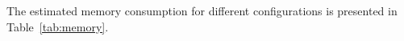 \documentclass[sigconf]{acmart}
\begin{document}
The estimated memory consumption for different configurations is presented in Table~\ref{tab:memory}.

\begin{table}[t]
    \centering
    \caption{Memory consumption estimates for training different LoRA modules.}
    \label{tab:memory}
\end{table}



\end{document}

